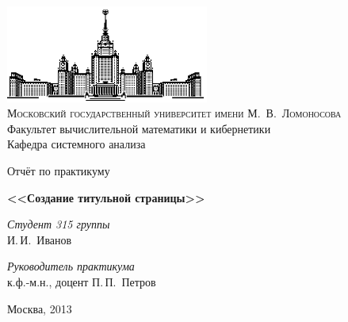 \documentclass[11pt]{article}
\begin{document}
\thispagestyle{empty}

\begin{center}
\ \vspace{-3cm}

\includegraphics[width=0.5\textwidth]{msu.eps}\\
{\scshape Московский государственный университет имени М.~В.~Ломоносова}\\
Факультет вычислительной математики и кибернетики\\
Кафедра системного анализа

\vfill

{\LARGE Отчёт по практикуму}

\vspace{1cm}

{\Huge\bfseries <<Создание титульной страницы>>}
\end{center}

\vspace{1cm}

\begin{flushright}
  \large
  \textit{Студент 315 группы}\\
  И.\,И.~Иванов

  \vspace{5mm}

  \textit{Руководитель практикума}\\
  к.ф.-м.н., доцент П.\,П.~Петров
\end{flushright}

\vfill

\begin{center}
Москва, 2013
\end{center}
\end{document}
